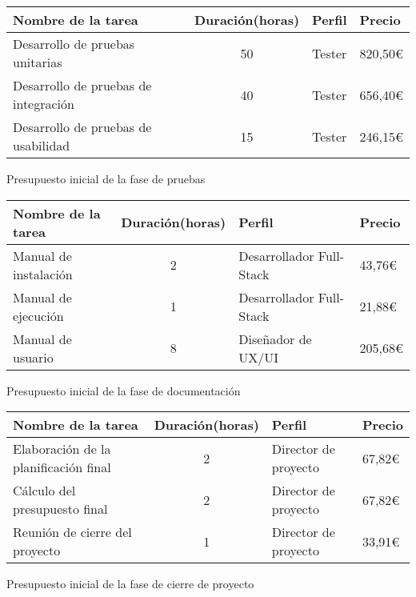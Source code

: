 \begin{planificacion}
	\centering
	\begin{tabular}{ | m{8.5cm} | c | m{2.5cm} |  m{1.5cm} |}
		\hline
		\textbf{Nombre de la tarea}          & \textbf{Duración(horas)} & \textbf{Perfil} & \textbf{Precio} \\\hline
		Desarrollo de pruebas unitarias      & 50                       & Tester          & 820,50€         \\\hline
		Desarrollo de pruebas de integración & 40                       & Tester          & 656,40€         \\\hline
		Desarrollo de pruebas de usabilidad  & 15                       & Tester          & 246,15€         \\\hline
	\end{tabular}
	\caption{Presupuesto inicial de la fase de pruebas}
\end{planificacion}

\begin{planificacion}
	\centering
	\begin{tabular}{ | m{8.5cm} | c | m{2.5cm} |  m{1.5cm} |}
		\hline
		\textbf{Nombre de la tarea} & \textbf{Duración(horas)} & \textbf{Perfil}          & \textbf{Precio} \\\hline
		Manual de instalación       & 2                        & Desarrollador Full-Stack & 43,76€          \\\hline
		Manual de ejecución         & 1                        & Desarrollador Full-Stack & 21,88€          \\\hline
		Manual de usuario           & 8                        & Diseñador de UX/UI       & 205,68€         \\\hline
	\end{tabular}
	\caption{Presupuesto inicial de la fase de documentación}
\end{planificacion}

\begin{planificacion}
	\centering
	\begin{tabular}{ | m{8.5cm} | c | m{2.5cm} |  m{1.5cm} |}
		\hline
		\textbf{Nombre de la tarea}           & \textbf{Duración(horas)} & \textbf{Perfil}      & \textbf{Precio} \\\hline
		Elaboración de la planificación final & 2                        & Director de proyecto & 67,82€          \\\hline
		Cálculo del presupuesto final         & 2                        & Director de proyecto & 67,82€          \\\hline
		Reunión de cierre del proyecto        & 1                        & Director de proyecto & 33,91€          \\\hline
	\end{tabular}
	\caption{Presupuesto inicial de la fase de cierre de proyecto}
\end{planificacion}
